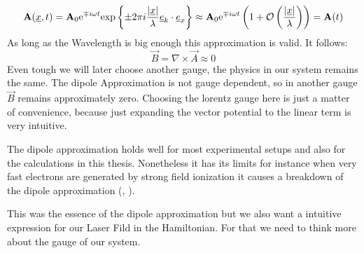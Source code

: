 \begin{equation*}
    \mathbf{A}(\underline{x}, t) = \mathbf{A}_0\mathrm{e}^{\mp i \omega t}\mathrm{exp}\left\{\pm2\pi i\frac{|\underline{x}|}{\lambda}\underline{e}_k \cdot \underline{e}_x\right\} \approx \mathbf{A}_0 \mathrm{e}^{\mp i \omega t}\left(1+\mathcal{O}\left(\frac{|\underline{x}|}{\lambda}\right)\right) = \mathbf{A}(t)
\end{equation*}
As long as the Wavelength is big enough this approximation is valid. It follows:
\begin{equation*}
    \vec{B} = \nabla \times \vec{A} \approx 0
\end{equation*}
Even tough we will later choose another gauge, the physics in our system remains the same. The dipole Approximation is not gauge dependent, so in another gauge $\vec{B}$ remains approximately zero.
Choosing the lorentz gauge here is just a matter of convenience, because just expanding the vector potential to the linear term is very intuitive. 

The dipole approximation holds well for most experimental setups and also for the calculations in this thesis.
Nonetheless it has its limits for instance when very fast electrons are generated by strong field ionization it causes a breakdown of the dipole approximation (\cite{bosmandipoleapprox}, \cite{breakdowndipoleapprox}).

This was the essence of the dipole approximation but we also want a intuitive expression for our Laser Fild in the Hamiltonian. 
For that we need to think more about the gauge of our system.






